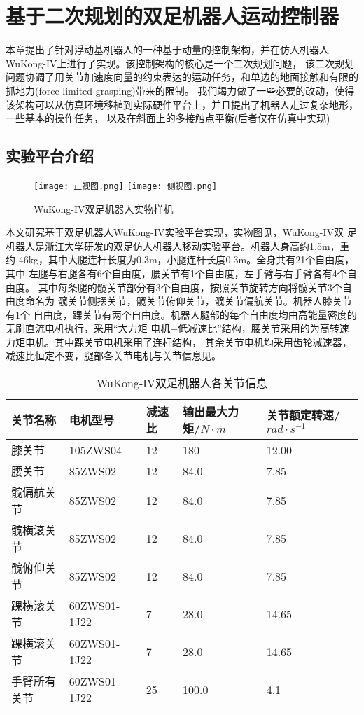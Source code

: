 \chapter{基于二次规划的双足机器人运动控制器}
本章提出了针对浮动基机器人的一种基于动量的控制架构，并在仿人机器人WuKong-IV上进行了实现。该控制架构的核心是一个二次规划问题，
该二次规划问题协调了用关节加速度向量的约束表达的运动任务，和单边的地面接触和有限的抓地力(force-limited grasping)带来的限制。
我们竭力做了一些必要的改动，使得该架构可以从仿真环境移植到实际硬件平台上，并且提出了机器人走过复杂地形，一些基本的操作任务，
以及在斜面上的多接触点平衡(后者仅在仿真中实现)
\section{实验平台介绍}
\begin{figure}[htbp]
    \centering
        {%
            \texttt{[image: 正视图.png]}}
        {%
            \texttt{[image: 侧视图.png]}}
    \caption{WuKong-IV双足机器人实物样机\label{fig:wukong_pic}}
\end{figure}
本文研究基于双足机器人WuKong-IV实验平台实现，实物图见，WuKong-IV双
足机器人是浙江大学研发的双足仿人机器人移动实验平台。机器人身高约1.5m，重约
46kg，其中大腿连杆长度为0.3m，小腿连杆长度0.3m。全身共有21个自由度，其中
左腿与右腿各有6个自由度，腰关节有1个自由度，左手臂与右手臂各有4个自由度。
其中每条腿的髋关节部分有3个自由度，按照关节旋转方向将髋关节3个自由度命名为
髋关节侧摆关节，髋关节俯仰关节，髋关节偏航关节。机器人膝关节有1个
自由度，踝关节有两个自由度。机器人腿部的每个自由度均由高能量密度的无刷直流电机执行，采用“大力矩
电机+低减速比”结构，腰关节采用的为高转速力矩电机。其中踝关节电机采用了连杆结构，
其余关节电机均采用齿轮减速器，减速比恒定不变，腿部各关节电机与关节信息见。
\begin{table}[htbp]
	\centering
	\caption{WuKong-IV双足机器人各关节信息}
	\label{joint_motor}
	\begin{tabular}{m{3cm}<{\centering}m{3cm}<{\centering}m{1.5cm}<{\centering}m{2cm}<{\centering}m{2.5cm}<{\centering}}
		\toprule  %
		关节名称   &电机型号  &减速比  &输出最大力矩/$N \cdot m$ &关节额定转速/$rad\cdot s^{-1}$ \\
		\midrule  %
		膝关节 & 105ZWS04 & 12 & 180 & 12.00\\
		腰关节 & 85ZWS02 & 12 & 84.0 & 7.85\\        
		髋偏航关节 & 85ZWS02 & 12 & 84.0 & 7.85\\
		髋横滚关节 & 85ZWS02 & 12 & 84.0 & 7.85\\
		髋俯仰关节 & 85ZWS02 & 12 & 84.0 & 7.85\\
        踝横滚关节 & 60ZWS01-1J22 & 7 & 28.0 & 14.65\\
        踝横滚关节 & 60ZWS01-1J22 & 7 & 28.0 & 14.65\\
        手臂所有关节 & 60ZWS01-1J22 & 25 & 100.0 & 4.1\\
		\bottomrule %
	\end{tabular}
\end{table}

